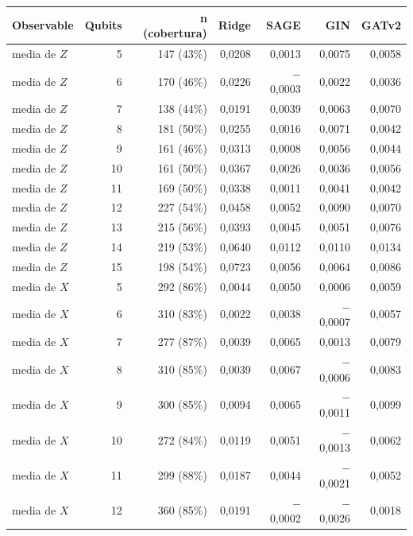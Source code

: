 \begin{table}[htbp]
    \centering
    {\footnotesize
    \begin{tabular}{@{}lrrrrrr@{}}
        \toprule
        \textbf{Observable} & \textbf{Qubits} & \textbf{n (cobertura)} & \textbf{Ridge} & \textbf{SAGE} & \textbf{GIN} & \textbf{GATv2} \\
        \midrule
        media de $Z$ & 5 & 147 (43\%) & 0,0208 & 0,0013 & 0,0075 & 0,0058 \\
        media de $Z$ & 6 & 170 (46\%) & 0,0226 & $-$0,0003 & 0,0022 & 0,0036 \\
        media de $Z$ & 7 & 138 (44\%) & 0,0191 & 0,0039 & 0,0063 & 0,0070 \\
        media de $Z$ & 8 & 181 (50\%) & 0,0255 & 0,0016 & 0,0071 & 0,0042 \\
        media de $Z$ & 9 & 161 (46\%) & 0,0313 & 0,0008 & 0,0056 & 0,0044 \\
        media de $Z$ & 10 & 161 (50\%) & 0,0367 & 0,0026 & 0,0036 & 0,0056 \\
        media de $Z$ & 11 & 169 (50\%) & 0,0338 & 0,0011 & 0,0041 & 0,0042 \\
        media de $Z$ & 12 & 227 (54\%) & 0,0458 & 0,0052 & 0,0090 & 0,0070 \\
        media de $Z$ & 13 & 215 (56\%) & 0,0393 & 0,0045 & 0,0051 & 0,0076 \\
        media de $Z$ & 14 & 219 (53\%) & 0,0640 & 0,0112 & 0,0110 & 0,0134 \\
        media de $Z$ & 15 & 198 (54\%) & 0,0723 & 0,0056 & 0,0064 & 0,0086 \\
        media de $X$ & 5 & 292 (86\%) & 0,0044 & 0,0050 & 0,0006 & 0,0059 \\
        media de $X$ & 6 & 310 (83\%) & 0,0022 & 0,0038 & $-$0,0007 & 0,0057 \\
        media de $X$ & 7 & 277 (87\%) & 0,0039 & 0,0065 & 0,0013 & 0,0079 \\
        media de $X$ & 8 & 310 (85\%) & 0,0039 & 0,0067 & $-$0,0006 & 0,0083 \\
        media de $X$ & 9 & 300 (85\%) & 0,0094 & 0,0065 & $-$0,0011 & 0,0099 \\
        media de $X$ & 10 & 272 (84\%) & 0,0119 & 0,0051 & $-$0,0013 & 0,0062 \\
        media de $X$ & 11 & 299 (88\%) & 0,0187 & 0,0044 & $-$0,0021 & 0,0052 \\
        media de $X$ & 12 & 360 (85\%) & 0,0191 & $-$0,0002 & $-$0,0026 & 0,0018 \\

\end{tabular}}
\end{table}
